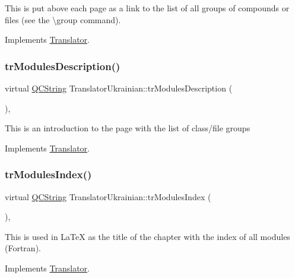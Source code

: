 This is put above each page as a link to the list of all groups of compounds or files (see the \textbackslash{}group command). 

Implements \mbox{\hyperlink{class_translator}{Translator}}.

\mbox{\label{class_translator_ukrainian_aea5ccfcefdf379b7b27ba07ce676aa0b}} 
\subsubsection{\texorpdfstring{trModulesDescription()}{trModulesDescription()}}
{\footnotesize\ttfamily virtual \mbox{\hyperlink{class_q_c_string}{Q\+C\+String}} Translator\+Ukrainian\+::tr\+Modules\+Description (\begin{DoxyParamCaption}{ }\end{DoxyParamCaption})\hspace{0.3cm}{\ttfamily [inline]}, {\ttfamily [virtual]}}

This is an introduction to the page with the list of class/file groups 

Implements \mbox{\hyperlink{class_translator}{Translator}}.

\mbox{\label{class_translator_ukrainian_aa9912e26ee9e36efe7692e71b3c9dca0}} 
\subsubsection{\texorpdfstring{trModulesIndex()}{trModulesIndex()}}
{\footnotesize\ttfamily virtual \mbox{\hyperlink{class_q_c_string}{Q\+C\+String}} Translator\+Ukrainian\+::tr\+Modules\+Index (\begin{DoxyParamCaption}{ }\end{DoxyParamCaption})\hspace{0.3cm}{\ttfamily [inline]}, {\ttfamily [virtual]}}

This is used in La\+TeX as the title of the chapter with the index of all modules (Fortran). 

Implements \mbox{\hyperlink{class_translator}{Translator}}.

